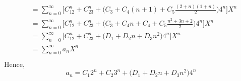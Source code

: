 \documentclass{article}
\begin{document}
\begin{flushleft}
\begin{align*}
                        & =\sum_{n=0}^{\infty}\bigg[C_12^n+C_23^n+\Big(C_3+C_4(n+1)+C_5\frac{(2+n)(1+n)}{2}\Big)4^n\bigg]X^n                                                                                \\
                        & =\sum_{n=0}^{\infty}\bigg[C_12^n+C_23^n+\Big(C_3+C_4n+C_4+C_5\frac{n^2+3n+2}{2}\Big)4^n\bigg]X^n                                                                                  \\
                        & =\sum_{n=0}^{\infty}\bigg[C_12^n+C_23^n+\Big(D_1+D_2n+D_3n^2\Big)4^n\bigg]X^n                                                                                                     \\
                        & =\sum_{n=0}^{\infty}a_nX^n                                                                                                                                                        \\
    \end{align*}
    Hence,\\
    \[a_{n}=C_{1}2^n+C_{2}3^n+\Big(D_{1}+D_{2}n+D_{3}n^2\Big)4^n\]
\end{flushleft}
\end{document}
